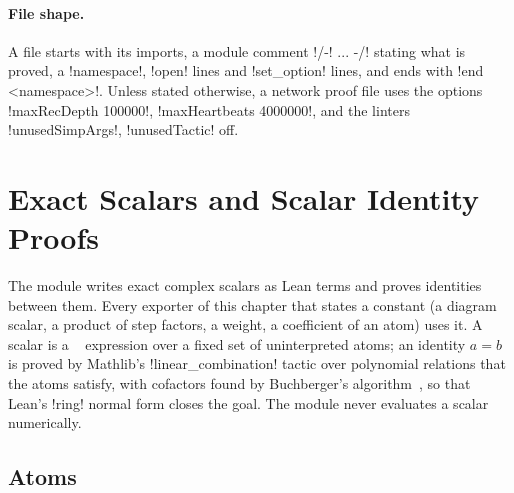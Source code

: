 {{{\paragraph{File shape.} A file starts with its imports, a module comment \lexcode!/-! ... -/!
stating what is proved, a \lexcode!namespace!, \lexcode!open! lines and \lexcode!set_option! lines, and ends
with \lexcode!end <namespace>!. Unless stated otherwise, a network proof file uses the options
\lexcode!maxRecDepth 100000!, \lexcode!maxHeartbeats 4000000!, and the linters
\lexcode!unusedSimpArgs!, \lexcode!unusedTactic! off.

\section{Exact Scalars and Scalar Identity Proofs}\label{sec:lean-export-scalar}

The module  writes exact complex scalars as Lean
terms and proves identities between them. Every exporter of this chapter that states a
constant (a diagram scalar, a product of step factors, a weight, a coefficient of an atom) uses
it. A scalar is a ~\cite{meurer2017sympy} expression over a
fixed set of uninterpreted atoms; an identity $a=b$ is proved by Mathlib's
\lexcode!linear_combination! tactic over polynomial relations that the atoms satisfy, with
cofactors found by Buchberger's algorithm~\cite{buchberger2006thesis}, so that Lean's
\lexcode!ring! normal form closes the goal. The module never evaluates a scalar numerically.

\subsection{Atoms}\label{sec:lean-export-scalar-atoms}

}}}
